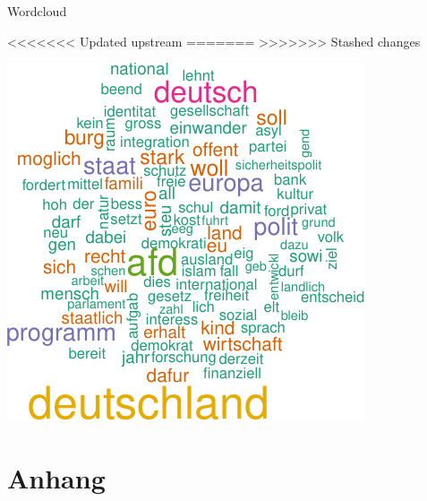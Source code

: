 \begin{frame}[fragile]{Wordcloud}

\begin{Shaded}
\begin{Highlighting}[]
<<<<<<< Updated upstream
\NormalTok{(}\OperatorTok{$}\OperatorTok{$} \NormalTok{, }
=======
\NormalTok{(}   \NormalTok{, }
>>>>>>> Stashed changes
     \NormalTok{(}\NormalTok{, }\NormalTok{), } \NormalTok{(}\NormalTok{, }\NormalTok{))}
\end{Highlighting}
\end{Shaded}

\begin{center}\includegraphics[width=0.8\linewidth]{PraDa_Folien_nm_2_files/figure-beamer/unnamed-chunk-41-1} \end{center}

\end{frame}

\section{Anhang}\label{anhang}
